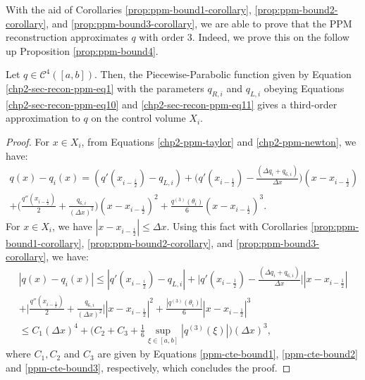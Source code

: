 With the aid of Corollaries \ref{prop:ppm-bound1-corollary}, \ref{prop:ppm-bound2-corollary},
and  \ref{prop:ppm-bound3-corollary}, we are able to prove
that the PPM reconstruction approximates $q$ with order 3.
Indeed, we prove this on the follow up Proposition \ref{prop:ppm-bound4}.

\begin{prop}
	\label{prop:ppm-bound4}
	Let $q \in \mathcal{C}^{4}([a,b])$.
	Then, the Piecewise-Parabolic function given by
	Equation \eqref{chp2-sec-recon-ppm-eq1} with 
	the parameters $q_{R,i}$ and $q_{L,i}$ obeying Equations
	\eqref{chp2-sec-recon-ppm-eq10} and \eqref{chp2-sec-recon-ppm-eq11}
	gives a third-order approximation to $q$ on the control volume $X_i$.
\end{prop}
\begin{proof}
For $x \in X_i$, from Equations \eqref{chp2-ppm-taylor} and \eqref{chp2-ppm-newton}, we have:
\begin{equation*}
	\begin{split}
	q(x)-q_i(x) = (q'(x_{i-\frac{i}{2}})-q_{L,i})	
	+ \bigg(q'(x_{i-\frac{1}{2}})-  \frac{(\Delta q_i + q_{6, i})}{\Delta x}\bigg)(x-x_{i-\frac{1}{2}})
	\\+ \bigg(\frac{q''(x_{i-\frac{1}{2}})}{2} + \frac{q_{6, i}}{(\Delta x)^2}\bigg)(x-x_{i-\frac{1}{2}})^2
	+ \frac{q^{(3)}(\theta_i)}{6}(x-x_{i-\frac{1}{2}})^3.
	\end{split}
\end{equation*}
For $x\in X_i$, we have $|x -x_{i-\frac{i}{2}}| \leq \Delta x$. 
Using this fact with Corollaries \ref{prop:ppm-bound1-corollary}, \ref{prop:ppm-bound2-corollary},
and  \ref{prop:ppm-bound3-corollary}, we have:
\begin{equation*}
	\begin{split}
	|q(x)-q_i(x)| \leq |q'(x_{i-\frac{i}{2}})-q_{L,i}|
	+ \bigg|q'(x_{i-\frac{1}{2}})-  \frac{(\Delta q_i + q_{6, i})}{\Delta x}\bigg||x-x_{i-\frac{1}{2}}|
	\\+ \bigg|\frac{q''(x_{i-\frac{1}{2}})}{2} + \frac{q_{6, i}}{(\Delta x)^2}\bigg||x-x_{i-\frac{1}{2}}|^2
	+ \frac{|q^{(3)}(\theta_i)|}{6}|x-x_{i-\frac{1}{2}}|^3 \\
	\leq C_1(\Delta x)^4 + \bigg(C_2+C_3+\frac{1}{6}
	\sup_{\xi \in [a,b]}{|q^{(3)}(\xi)|} \bigg)(\Delta x)^3,
	\end{split}
\end{equation*}
where $C_1, C_2$ and $C_3$ are given by Equations \eqref{ppm-cte-bound1},
\eqref{ppm-cte-bound2} and \eqref{ppm-cte-bound3}, respectively, which
concludes the proof.
\end{proof}

